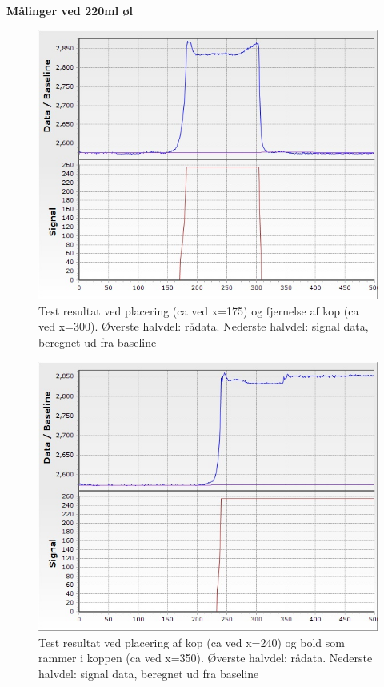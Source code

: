 \documentclass[HardwareDesign/HardwareDesign_main.tex]{subfiles}
\begin{document}
\textbf{Målinger ved 220ml øl}
\begin{figure}[H]
    \centering
    \includegraphics[width=\textwidth]{HardwareDesign/CupSensor/graphics/CapTest/placingAndRemovingCup2(beer-220ml).jpg}
    \caption{Test resultat ved placering (ca ved x=175) og fjernelse af kop (ca ved x=300). Øverste halvdel: rådata. Nederste halvdel: signal data, beregnet ud fra baseline}
    \label{fig:cap_test_place_and_remove_220}
\end{figure}


\begin{figure}[H]
    \centering
    \includegraphics[width=\textwidth]{HardwareDesign/CupSensor/graphics/CapTest/placingCupAndDroppingBall1(beer-220ml).jpg}
    \caption{Test resultat ved placering af kop (ca ved x=240) og bold som rammer i koppen (ca ved x=350). Øverste halvdel: rådata. Nederste halvdel: signal data, beregnet ud fra baseline}
    \label{fig:cap_test_place_and_drop_220}
\end{figure}
\end{document}
